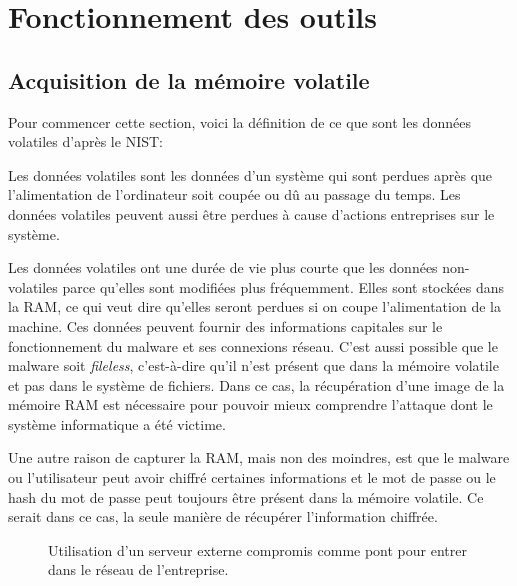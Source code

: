 \section{Fonctionnement des outils}



\subsection{Acquisition de la mémoire volatile}

Pour commencer cette section, voici la définition de ce que sont les données volatiles d'après le NIST: \cite{5}

\begin{customquote}
    Les données volatiles sont les données d'un système qui sont perdues après que l'alimentation de l'ordinateur soit coupée ou dû au passage du temps. Les données volatiles peuvent aussi être perdues à cause d'actions entreprises sur le système.

\end{customquote}

Les données volatiles ont une durée de vie plus courte que les données non-volatiles parce qu'elles sont modifiées plus fréquemment. Elles sont stockées dans la RAM, ce qui veut dire qu'elles seront perdues si on coupe l'alimentation de la machine. Ces données peuvent fournir des informations capitales sur le fonctionnement du malware et ses connexions réseau. C'est aussi possible que le malware soit \textit{fileless}, c'est-à-dire qu'il n'est présent que dans la mémoire volatile et pas dans le système de fichiers. Dans ce cas, la récupération d'une image de la mémoire RAM est nécessaire pour pouvoir mieux comprendre l'attaque dont le système informatique a été victime.

Une autre raison de capturer la RAM, mais non des moindres, est que le malware ou l'utilisateur peut avoir chiffré certaines informations et le mot de passe ou le hash du mot de passe peut toujours être présent dans la mémoire volatile. Ce serait dans ce cas, la seule manière de récupérer l'information chiffrée.

\begin{figure}
    \centering
    \caption{Utilisation d'un serveur externe compromis comme pont pour entrer dans le réseau de l'entreprise.}
    \label{fig:attack-bridge}
\end{figure}

